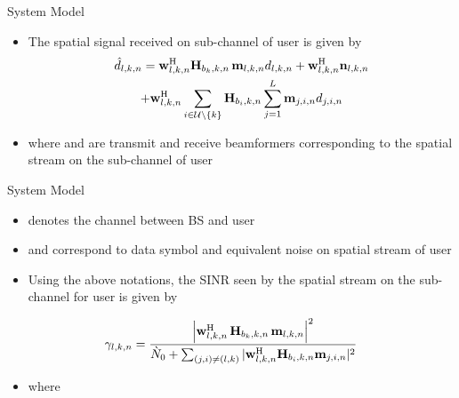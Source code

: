 \documentclass[9pt]{beamer}
\begin{document}
\begin{frame}{System Model}
\begin{itemize}
\item The  spatial signal received on sub-channel  of user  is given by
\begin{multline}\label{eqn-1}
\hat{d}_{l,k,n} = \mathbf{w}_{l,k,n}^{\mathrm{H}} \mathbf{H}_{b_k,k,n} \,\mathbf{m}_{l,k,n} d_{l,k,n} + \mathbf{w}_{l,k,n}^{\mathrm{H}} \mathbf{n}_{l,k,n} \\ 
+ \mathbf{w}_{l,k,n}^{\mathrm{H}} \sum_{i \in \mathcal{U} \backslash \left \lbrace k \right \rbrace} \mathbf{H}_{b_i,k,n} \sum_{j = 1}^L \mathbf{m}_{j,i,n}d_{j,i,n}
\end{multline}
\item where  and  are transmit and receive beamformers corresponding to the  spatial stream on the  sub-channel of user 
\end{itemize}
\end{frame}

\begin{frame}{System Model}
\begin{itemize}
\item {} denotes the channel between \ac{BS}  and user 
\item {} and  correspond to data symbol and equivalent noise on  spatial stream of user 
\item Using the above notations, the \acs{SINR} seen by the  spatial stream on the  sub-channel for user  is given by
\end{itemize}
\begin{equation}\label{eq:SINR}
\gamma_{l,k,n} = \dfrac{\left |\mathbf{w}_{l,k,n}^{\mathrm{H}} \, \mathbf{H}_{b_k,k,n} \, \mathbf{m}_{l,k,n} \right |^2}{\grave{N}_0 + \sum_{(j,i) \neq (l,k)} |\mathbf{w}_{l,k,n}^{\mathrm{H}} \mathbf{H}_{b_i,k,n} \mathbf{m}_{j,i,n} |^2}
\end{equation}
\begin{itemize}
\item where 
\end{itemize}
\end{frame}
\end{document}
